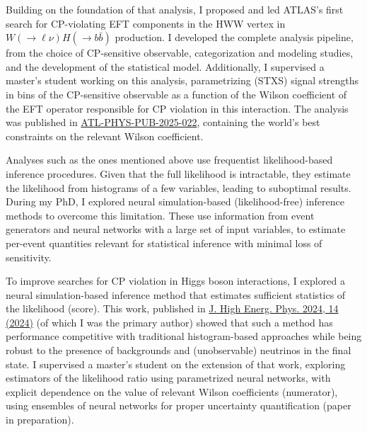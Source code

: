 \documentclass[11pt, a4paper]{awesome-cv}
\begin{document}
\begin{cvletter}
  Building on the foundation of that analysis, I proposed and led ATLAS's first search for CP-violating EFT components in the HWW vertex in $W(\to \ell \nu)H(\to b\bar{b})$ production. I developed the complete analysis pipeline, from the choice of CP-sensitive observable, categorization and modeling studies, and the development of the statistical model. Additionally, I supervised a master's student working on this analysis, parametrizing (STXS) signal strengths in bins of the CP-sensitive observable as a function of the Wilson coefficient of the EFT operator responsible for CP violation in this interaction. The analysis was published in \href{https://atlas.web.cern.ch/Atlas/GROUPS/PHYSICS/PUBNOTES/ATL-PHYS-PUB-2025-022/}{ATL-PHYS-PUB-2025-022}, containing the world's best constraints on the relevant Wilson coefficient.
  
  
  Analyses such as the ones mentioned above use frequentist likelihood-based inference procedures. Given that the full likelihood is intractable, they estimate the likelihood from histograms of a few variables, leading to suboptimal results. During my PhD, I explored neural simulation-based (likelihood-free) inference methods to overcome this limitation. These use information from event generators and neural networks with a large set of input variables, to estimate per-event quantities relevant for statistical inference with minimal loss of sensitivity.
  
  To improve searches for CP violation in Higgs boson interactions, I explored a neural simulation-based inference method that estimates sufficient statistics of the likelihood (score). This work, published in \href{https://doi.org/10.1007/JHEP04(2024)014}{J. High Energ. Phys. 2024, 14 (2024)} (of which I was the primary author) showed that such a method has performance competitive with traditional histogram-based approaches while being robust to the presence of backgrounds and (unobservable) neutrinos in the final state. I supervised a master's student on the extension of that work, exploring estimators of the likelihood ratio using parametrized neural networks, with explicit dependence on the value of relevant Wilson coefficients (numerator), using ensembles of neural networks for proper uncertainty quantification (paper in preparation).
  
  

\end{cvletter}
\end{document}
